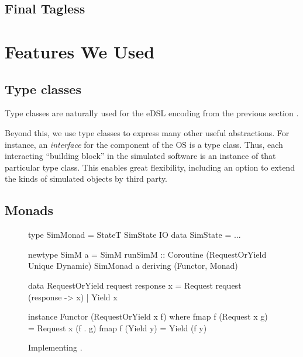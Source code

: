 \subsection{Final Tagless}


\section{Features We Used}
\label{sec:impl-detail}


\subsection{Type classes}

Type classes are naturally used for the eDSL encoding from the previous section \cite{Hall:1996:TCH:227699.227700,final_tagless_embedding}.

Beyond this, we use type classes to express many other useful abstractions.
For instance, an \emph{interface} for the component of the OS is a type class.
Thus, each interacting ``building block'' in the simulated software is an instance of that particular type class.
This enables great flexibility, including an option to extend the kinds of simulated objects by third party.

\subsection{Monads}
\label{sec:impl-monads}
\begin{figure}
\centering
\begin{code*}
type SimMonad =  StateT SimState IO
data SimState = ...

newtype SimM a
  = SimM { runSimM :: Coroutine
      (RequestOrYield Unique Dynamic)
      SimMonad a }
    deriving (Functor, Monad)

data RequestOrYield request response x
  = Request request (response -> x)
  | Yield   x

instance Functor (RequestOrYield x f) where
  fmap f (Request x g) = Request x (f . g)
  fmap f (Yield y)     = Yield (f y)
\end{code*}
\caption{Implementing .}
\label{fig:code-simm}
\end{figure}


